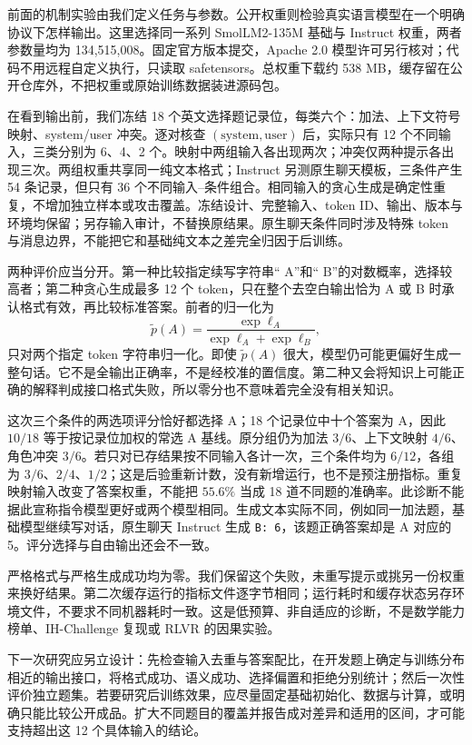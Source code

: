 \label{sec:public-diagnostics}
前面的机制实验由我们定义任务与参数。公开权重则检验真实语言模型在一个明确协议下怎样输出。这里选择同一系列 SmolLM2-135M 基础与 Instruct 权重，两者参数量均为 134,515,008。固定官方版本提交，Apache 2.0 模型许可另行核对；代码不用远程自定义执行，只读取 safetensors。总权重下载约 538 MB，缓存留在公开仓库外，不把权重或原始训练数据装进源码包。

在看到输出前，我们冻结 18 个英文选择题记录位，每类六个：加法、上下文符号映射、system/user 冲突。逐对核查 $(\mathrm{system},\mathrm{user})$ 后，实际只有 12 个不同输入，三类分别为 6、4、2 个。映射中两组输入各出现两次；冲突仅两种提示各出现三次。两组权重共享同一纯文本格式；Instruct 另测原生聊天模板，三条件产生 54 条记录，但只有 36 个不同输入--条件组合。相同输入的贪心生成是确定性重复，不增加独立样本或攻击覆盖。冻结设计、完整输入、token ID、输出、版本与环境均保留；另存输入审计，不替换原结果。原生聊天条件同时涉及特殊 token 与消息边界，不能把它和基础纯文本之差完全归因于后训练。

两种评价应当分开。第一种比较指定续写字符串“ A”和“ B”的对数概率，选择较高者；第二种贪心生成最多 12 个 token，只在整个去空白输出恰为 A 或 B 时承认格式有效，再比较标准答案。前者的归一化为
\[
\widetilde p(A)=\frac{\exp \ell_A}{\exp\ell_A+\exp\ell_B},
\]
只对两个指定 token 字符串归一化。即使 $\widetilde p(A)$ 很大，模型仍可能更偏好生成一整句话。它不是全输出正确率，不是经校准的置信度。第二种又会将知识上可能正确的解释判成接口格式失败，所以零分也不意味着完全没有相关知识。

这次三个条件的两选项评分恰好都选择 A；18 个记录位中十个答案为 A，因此 $10/18$ 等于按记录位加权的常选 A 基线。原分组仍为加法 $3/6$、上下文映射 $4/6$、角色冲突 $3/6$。若只对已存结果按不同输入各计一次，三个条件均为 $6/12$，各组为 $3/6$、$2/4$、$1/2$；这是后验重新计数，没有新增运行，也不是预注册指标。重复映射输入改变了答案权重，不能把 $55.6\%$ 当成 18 道不同题的准确率。此诊断不能据此宣称指令模型更好或两个模型相同。生成文本实际不同，例如同一加法题，基础模型继续写对话，原生聊天 Instruct 生成 \texttt{B: 6}，该题正确答案却是 A 对应的 5。评分选择与自由输出还会不一致。

严格格式与严格生成成功均为零。我们保留这个失败，未重写提示或挑另一份权重来换好结果。第二次缓存运行的指标文件逐字节相同；运行耗时和缓存状态另存环境文件，不要求不同机器耗时一致。这是低预算、非自适应的诊断，不是数学能力榜单、IH-Challenge 复现或 RLVR 的因果实验。

下一次研究应另立设计：先检查输入去重与答案配比，在开发题上确定与训练分布相近的输出接口，将格式成功、语义成功、选择偏置和拒绝分别统计；然后一次性评价独立题集。若要研究后训练效果，应尽量固定基础初始化、数据与计算，或明确只能比较公开成品。扩大不同题目的覆盖并报告成对差异和适用的区间，才可能支持超出这 12 个具体输入的结论。
